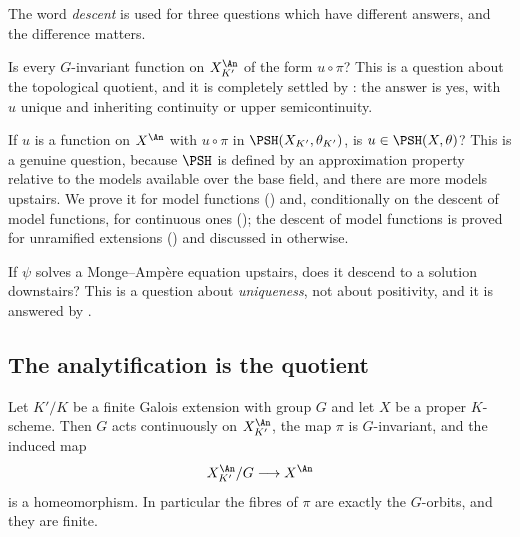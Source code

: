 The word \emph{descent} is used for three questions which have different
answers, and the difference matters.

\begin{description}[style=nextline,leftmargin=0pt,labelindent=0pt,
  labelsep=0pt,itemsep=.5\baselineskip,font=\normalfont\itshape]
\item[(Q1) Functions.]
Is every \(G\)-invariant function on \(X_{K'}^{\An}\) of the form
\(u\circ\pi\)?  This is a question about the topological quotient, and it is
completely settled by : the answer is yes,
with \(u\) unique and inheriting continuity or upper semicontinuity.

\item[(Q2) Positivity.]
If \(u\) is a function on \(X^{\An}\) with \(u\circ\pi\) in
\(\PSH(X_{K'},\theta_{K'})\), is \(u\in\PSH(X,\theta)\)?  This is a genuine
question, because \(\PSH\) is defined by an approximation property relative
to the models available over the base field, and there are more models
upstairs.  We prove it for model functions
() and, conditionally on the descent of
model functions, for continuous ones
(); the descent of model functions is
proved for unramified extensions
() and discussed in
 otherwise.

\item[(Q3) Solutions.]
If \(\psi\) solves a Monge--Amp\`ere equation upstairs, does it descend to a
solution downstairs?  This is a question about \emph{uniqueness}, not about
positivity, and it is answered by
.
\end{description}

\subsection{The analytification is the quotient}
\label{sec:ch30-galois-quotient}

\begin{theorem}
\label{thm:ch30-galois-quotient}
Let \(K'/K\) be a finite Galois extension with group \(G\) and let \(X\) be
a proper \(K\)-scheme.  Then \(G\) acts continuously on \(X_{K'}^{\An}\),
the map \(\pi\) is \(G\)-invariant, and the induced map
\begin{equation}
\label{eq:ch30-galois-quotient}
 X_{K'}^{\An}/G\longrightarrow X^{\An}
\end{equation}
is a homeomorphism.  In particular the fibres of \(\pi\) are exactly the
\(G\)-orbits, and they are finite.
\end{theorem}

